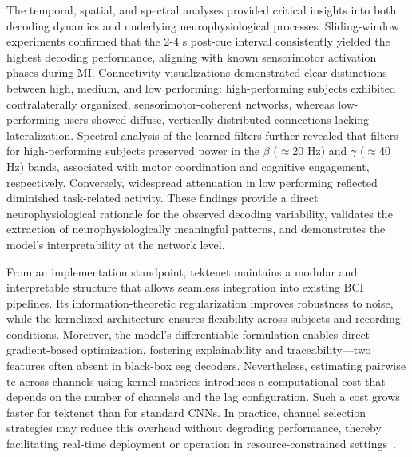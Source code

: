 The temporal, spatial, and spectral analyses provided critical insights into both decoding dynamics and underlying neurophysiological processes. Sliding-window experiments confirmed that the 2-4 s post-cue interval consistently yielded the highest decoding performance, aligning with known sensorimotor activation phases during MI. Connectivity visualizations demonstrated clear distinctions between high, medium, and low performing: high-performing subjects exhibited contralaterally organized, sensorimotor-coherent networks, whereas low-performing users showed diffuse, vertically distributed connections lacking lateralization. Spectral analysis of the learned filters further revealed that filters for high-performing subjects preserved power in the $\beta$ ($\approx$20 Hz) and $\gamma$ ($\approx$40 Hz) bands, associated with motor coordination and cognitive engagement, respectively. Conversely, widespread attenuation in low performing reflected diminished task-related activity. These findings provide a direct neurophysiological rationale for the observed decoding variability, 
validates the extraction of neurophysiologically meaningful patterns, and demonstrates the model's interpretability at the network level. 

From an implementation standpoint, \gls{tektenet} maintains a modular and interpretable structure that allows seamless integration into existing BCI pipelines. Its information-theoretic regularization improves robustness to noise, while the kernelized architecture ensures flexibility across subjects and recording conditions. Moreover, the model’s differentiable formulation enables direct gradient-based optimization, fostering explainability and traceability—two features often absent in black-box \gls{eeg} decoders. Nevertheless, estimating pairwise \gls{te} across channels using kernel matrices introduces a computational cost that depends on the number of channels and the lag configuration. Such a cost grows faster for \gls{tektenet} than for standard CNNs. In practice, channel selection strategies may reduce this overhead without degrading performance, thereby facilitating real-time deployment or operation in resource-constrained settings~\cite{Maksimenko}.

